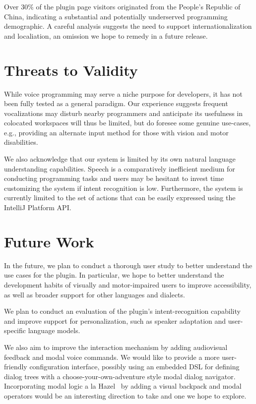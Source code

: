 \documentclass[conference]{IEEEtran}
\begin{document}

Over 30\% of the plugin page visitors originated from the People's Republic of China, indicating a substantial and potentially underserved programming demographic. A careful analysis suggests the need to support internationalization and localiation, an omission we hope to remedy in a future release.

\section{Threats to Validity}

While voice programming may serve a niche purpose for developers, it has not been fully tested as a general paradigm. Our experience suggests frequent vocalizations may disturb nearby programmers and anticipate its usefulness in colocated workspaces will thus be limited, but do foresee some genuine use-cases, e.g., providing an alternate input method for those with vision and motor disabilities.

We also acknowledge that our system is limited by its own natural language understanding capabilities. Speech is a comparatively inefficient medium for conducting programming tasks and users may be hesitant to invest time customizing the system if intent recognition is low. Furthermore, the system is currently limited to the set of actions that can be easily expressed using the IntelliJ Platform API.

\section{Future Work}

In the future, we plan to conduct a thorough user study to better understand the use cases for the plugin. In particular, we hope to better understand the development habits of visually and motor-impaired users to improve accessibility, as well as broader support for other languages and dialects.

We plan to conduct an evaluation of the plugin's intent-recognition capability and improve support for personalization, such as speaker adaptation and user-specific language models.

We also aim to improve the interaction mechanism by adding audiovisual feedback and modal voice commands. We would like to provide a more user-friendly configuration interface, possibly using an embedded DSL for defining dialog trees with a choose-your-own-adventure style modal dialog navigator. Incorporating modal logic a la Hazel~\cite{omar2021filling} by adding a visual backpack and modal operators would be an interesting direction to take and one we hope to explore.
\end{document}
